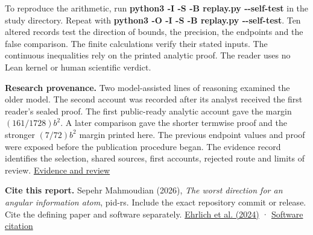 To reproduce the arithmetic, run \textbf{python3 -I -S -B replay.py -\/-self-test} in the study directory. Repeat with \textbf{python3 -O -I -S -B replay.py -\/-self-test}. Ten altered records test the direction of bounds, the precision, the endpoints and the false comparison. The finite calculations verify their stated inputs. The continuous inequalities rely on the printed analytic proof. The reader uses no Lean kernel or human scientific verdict.

\textbf{Research provenance.} Two model-assisted lines of reasoning examined the older model. The second account was recorded after its analyst received the first reader's sealed proof. The first public-ready analytic account gave the margin \((161/1728)b^2\). A later comparison gave the shorter termwise proof and the stronger \((7/72)b^2\) margin printed here. The previous endpoint values and proof were exposed before the publication procedure began. The evidence record identifies the selection, shared sources, first accounts, rejected route and limits of review. \href{https://github.com/sepahead/pid-rs/blob/main/audit/research/angular-truncation-extremum/EVIDENCE.md}{Evidence and review}

\textbf{Cite this report.} Sepehr Mahmoudian (2026), \emph{The worst direction for an angular information atom}, pid-rs. Include the exact repository commit or release. Cite the defining paper and software separately. \href{https://doi.org/10.1103/PhysRevE.110.014115}{Ehrlich et al. (2024)} · \href{https://github.com/sepahead/pid-rs/blob/main/CITATION.cff}{Software citation}
